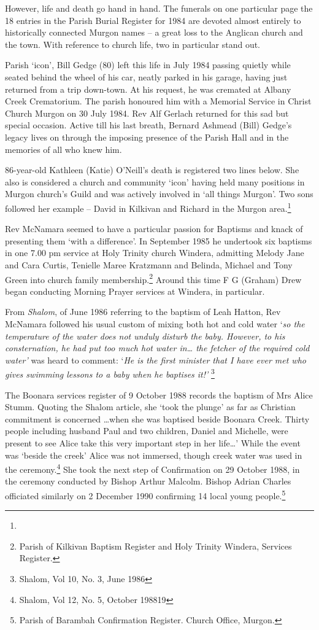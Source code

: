 However, life and death go hand in hand. The funerals on one particular page the 18 entries in the Parish Burial Register for 1984 are devoted almost entirely to historically connected Murgon names -- a great loss to the Anglican church and the town. With reference to church life, two in particular stand out.

Parish `icon', Bill Gedge (80) left this life in July 1984 passing quietly while seated behind the wheel of his car, neatly parked in his garage, having just returned from a trip down-town. At his request, he was cremated at Albany Creek Crematorium. The parish honoured him with a Memorial Service in Christ Church Murgon on 30 July 1984. Rev Alf Gerlach returned for this sad but special occasion. Active till his last breath, Bernard Ashmead (Bill) Gedge's legacy lives on through the imposing presence of the Parish Hall and in the memories of all who knew him.

86-year-old Kathleen (Katie) O'Neill's death is registered two lines below. She also is considered a church and community `icon' having held many positions in Murgon church's Guild and was actively involved in `all things Murgon'. Two sons followed her example -- David in Kilkivan and Richard in the Murgon area.\footnote{}

Rev McNamara seemed to have a particular passion for Baptisms and knack of presenting them `with a difference'. In September 1985 he undertook six baptisms in one 7.00 pm service at Holy Trinity church Windera, admitting Melody Jane and Cara Curtis, Tenielle Maree Kratzmann and Belinda, Michael and Tony Green into church family membership.\footnote{Parish of Kilkivan Baptism Register and Holy Trinity Windera, Services Register.} Around this time F G (Graham) Drew began conducting Morning Prayer services at Windera, in particular.

From \emph{Shalom}, of June 1986 referring to the baptism of Leah Hatton, Rev McNamara followed his usual custom of mixing both hot and cold water `\emph{so the temperature of the water does not unduly disturb the baby. However, to his consternation, he had put too much hot water in\ldots{} the fetcher of the required cold water'} was heard to comment: `\emph{He is the first minister that I have ever met who gives swimming lessons to a baby when he baptises it!'} \footnote{Shalom, Vol 10, No. 3, June 1986}

The Boonara services register of 9 October 1988 records the baptism of Mrs Alice Stumm. Quoting the Shalom article, she `took the plunge' as far as Christian commitment is concerned \ldots when she was baptised beside Boonara Creek. Thirty people including husband Paul and two children, Daniel and Michelle, were present to see Alice take this very important step in her life\ldots' While the event was `beside the creek' Alice was not immersed, though creek water was used in the ceremony.\footnote{Shalom, Vol 12, No. 5, October 198819} She took the next step of Confirmation on 29 October 1988, in the ceremony conducted by Bishop Arthur Malcolm. Bishop Adrian Charles officiated similarly on 2 December 1990 confirming 14 local young people.\footnote{Parish of Barambah Confirmation Register. Church Office, Murgon.}

